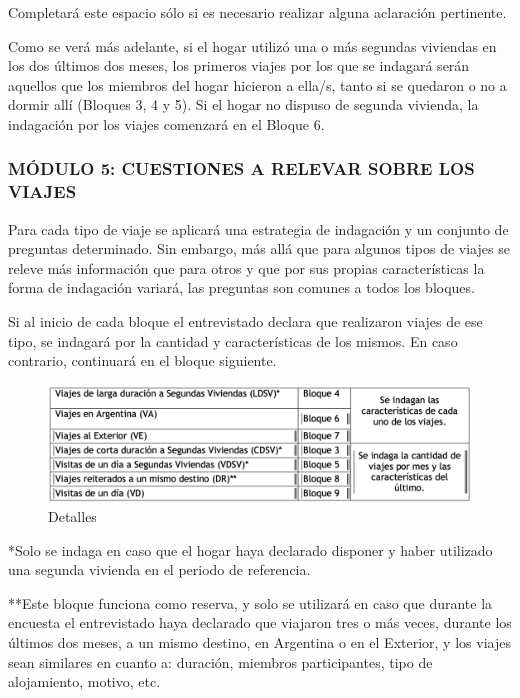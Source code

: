 \documentclass[
  openany]{book}
\begin{document}
Completará este espacio sólo si es necesario realizar alguna aclaración pertinente.

Como se verá más adelante, si el hogar utilizó una o más segundas viviendas en los dos últimos dos meses, los primeros viajes por los que se indagará serán aquellos que los miembros del hogar hicieron a ella/s, tanto si se quedaron o no a dormir allí (Bloques 3, 4 y 5). Si el hogar no dispuso de segunda vivienda, la indagación por los viajes comenzará en el Bloque 6.

\hypertarget{muxf3dulo-5-cuestiones-a-relevar-sobre-los-viajes}{%
\subsubsection{\texorpdfstring{\textbf{MÓDULO 5: CUESTIONES A RELEVAR SOBRE LOS VIAJES}}{MÓDULO 5: CUESTIONES A RELEVAR SOBRE LOS VIAJES}}\label{muxf3dulo-5-cuestiones-a-relevar-sobre-los-viajes}}

Para cada tipo de viaje se aplicará una estrategia de indagación y un conjunto de preguntas determinado. Sin embargo, más allá que para algunos tipos de viajes se releve más información que para otros y que por sus propias características la forma de indagación variará, las preguntas son comunes a todos los bloques.

Si al inicio de cada bloque el entrevistado declara que realizaron viajes de ese tipo, se indagará por la cantidad y características de los mismos. En caso contrario, continuará en el bloque siguiente.

\begin{figure}

{\centering \includegraphics[width=1\linewidth]{imagenes/figura6-71} 

}

\caption{Detalles}\label{fig:detalle}
\end{figure}

*Solo se indaga en caso que el hogar haya declarado disponer y haber utilizado una segunda vivienda en el periodo de referencia.

**Este bloque funciona como reserva, y solo se utilizará en caso que durante la encuesta el entrevistado haya declarado que viajaron tres o más veces, durante los últimos dos meses, a un mismo destino, en Argentina o en el Exterior, y los viajes sean similares en cuanto a: duración, miembros participantes, tipo de alojamiento, motivo, etc.
\end{document}
